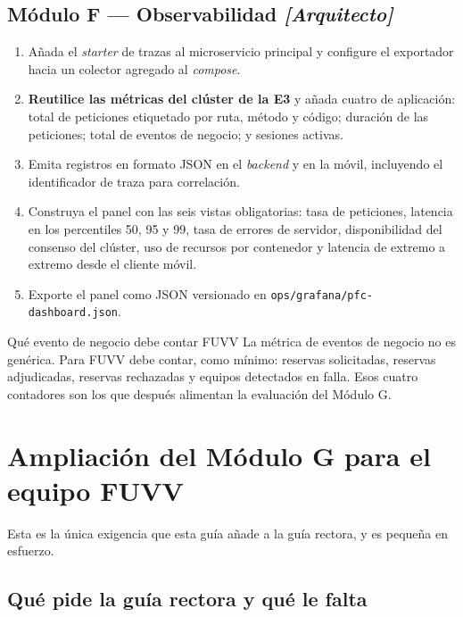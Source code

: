 \documentclass[11pt,a4paper]{article}
\begin{document}
\subsection{Módulo F --- Observabilidad \emph{[Arquitecto]}}

\begin{enumerate}[leftmargin=*,itemsep=3pt]
	\item Añada el \emph{starter} de trazas al microservicio principal y configure el exportador hacia un colector agregado al \emph{compose}.
	\item \textbf{Reutilice las métricas del clúster de la E3} y añada cuatro de aplicación: total de peticiones etiquetado por ruta, método y código; duración de las peticiones; total de eventos de negocio; y sesiones activas.
	\item Emita registros en formato JSON en el \emph{backend} y en la móvil, incluyendo el identificador de traza para correlación.
	\item Construya el panel con las seis vistas obligatorias: tasa de peticiones, latencia en los percentiles 50, 95 y 99, tasa de errores de servidor, disponibilidad del consenso del clúster, uso de recursos por contenedor y latencia de extremo a extremo desde el cliente móvil.
	\item Exporte el panel como JSON versionado en \texttt{ops/grafana/\allowbreak pfc-dashboard.json}.
\end{enumerate}

\begin{defBox}{Qué evento de negocio debe contar FUVV}
	La métrica de eventos de negocio no es genérica. Para FUVV debe contar, como mínimo: reservas solicitadas, reservas adjudicadas, reservas rechazadas y equipos detectados en falla. Esos cuatro contadores son los que después alimentan la evaluación del Módulo G.
\end{defBox}

\section{Ampliación del Módulo G para el equipo FUVV}

Esta es la única exigencia que esta guía añade a la guía rectora, y es pequeña en esfuerzo.

\subsection{Qué pide la guía rectora y qué le falta}
\end{document}
